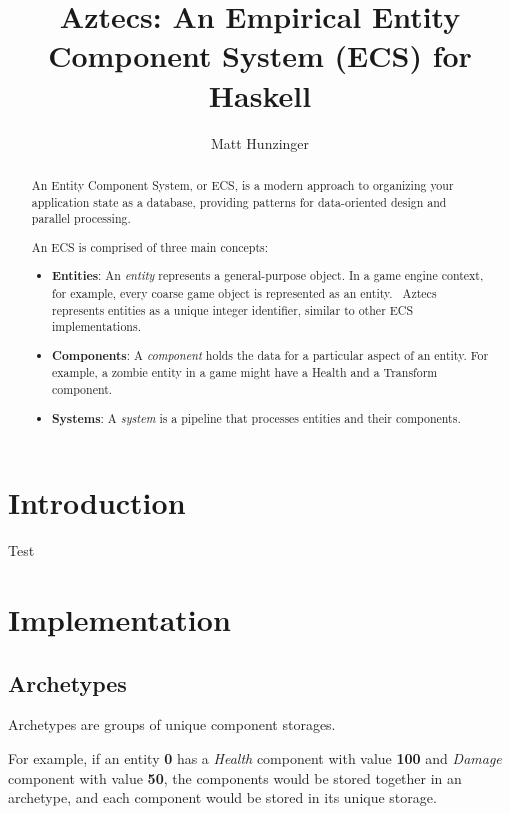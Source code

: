 \documentclass[sigplan,screen,nonacm]{acmart}
\title{Aztecs: An Empirical Entity Component System (ECS) for Haskell}
\author{Matt Hunzinger}
\begin{document}
\begin{abstract}
  An Entity Component System, or ECS,
  is a modern approach to organizing your application state as a database,
  providing patterns for data-oriented design and parallel processing.\par

  An ECS is comprised of three main concepts:
  \begin{itemize}
    \item \textbf{Entities}: An \textit{entity} represents a general-purpose object. In a game engine
          context, for example, every coarse game object is represented as an
          entity.~\cite{ecsWiki} Aztecs represents entities as a unique integer
          identifier, similar to other ECS implementations.
    \item \textbf{Components}: A \textit{component} holds the data for a particular aspect of an entity.
          For example, a zombie entity in a game might have a Health and a Transform component.
    \item \textbf{Systems}: A \textit{system} is a pipeline that processes entities and their components.
  \end{itemize}
\end{abstract}

\maketitle

\section{Introduction}

Test

\section{Implementation}

\subsection{Archetypes}

Archetypes are groups of unique component storages.\par

For example, if an entity \textbf{0} has a \textit{Health} component with value
\textbf{100} and \textit{Damage} component with value \textbf{50}, the
components would be stored together in an archetype, and each component would
be stored in its unique storage.
\end{document}
